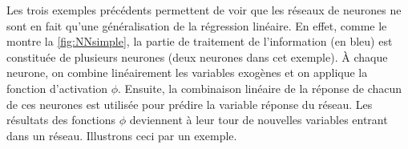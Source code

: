 \begin{figure}[h]
\end{figure}


Les trois exemples précédents permettent de voir que les réseaux de neurones ne sont en fait qu'une généralisation de la régression linéaire. En effet, comme le montre la \autoref{fig:NNsimple}, la partie de traitement de l'information (en bleu) est constituée de plusieurs neurones (deux neurones dans cet exemple). À chaque neurone, on combine linéairement les variables exogènes et on applique la fonction d'activation $\phi$. Ensuite, la combinaison linéaire de la réponse de chacun de ces neurones est utilisée pour prédire la variable réponse du réseau. Les résultats des fonctions $\phi$ deviennent à leur tour de nouvelles variables entrant dans un réseau. Illustrons ceci par un exemple.

